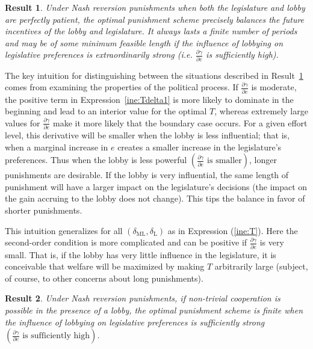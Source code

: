 \documentclass[authoryear, review]{elsarticle}
\newtheorem{result}{Result}
\newcommand{\ga}{\gamma}
\newcommand{\de}{\delta}
\begin{document}
\begin{result}
  Under Nash reversion punishments when both the legislature and lobby are perfectly patient, the optimal punishment scheme precisely balances the future incentives of the lobby and legislature. It always lasts a finite number of periods and may be of some minimum feasible length if the influence of lobbying on legislative preferences is extraordinarily strong (i.e. $\frac{\partial \ga}{\partial e}$ is sufficiently high).
  \label{res:opt1}
\end{result}

The key intuition for distinguishing between the situations described in Result~\ref{res:opt1} comes from examining the properties of the political process. If $\frac{\partial \ga}{\partial e}$ is moderate, the positive term in Expression~\ref{ine:Tdelta1} is more likely to dominate in the beginning and lead to an interior value for the optimal $T$, whereas extremely large values for $\frac{\partial \ga}{\partial e}$ make it more likely that the boundary case occurs. For a given effort level, this derivative will be smaller when the lobby is less influential; that is, when a marginal increase in $e$ creates a smaller increase in the legislature's preferences. Thus when the lobby is less powerful $\left(\frac{\partial \ga}{\partial e}\text{ is smaller}\right)$, longer punishments are desirable. If the lobby is very influential, the same length of punishment will have a larger impact on the legislature's decisions (the impact on the gain accruing to the lobby does not change). This tips the balance in favor of shorter punishments.

This intuition generalizes for all $\left(\de_\text{ML},\de_\text{L}\right)$ as in Expression (\ref{ine:T}). Here the second-order condition is more complicated and can be positive if $\frac{\partial \ga}{\partial e}$ is very small. That is, if the lobby has very little influence in the legislature, it is conceivable that welfare will be maximized by making $T$ arbitrarily large (subject, of course, to other concerns about long punishments).

\begin{result}
  Under Nash reversion punishments, if non-trivial cooperation is possible in the presence of a lobby, the optimal punishment scheme is finite when the influence of lobbying on legislative preferences is sufficiently strong $\left(\frac{\partial \ga}{\partial e}\text{ is sufficiently high}\right)$.
\end{result}
\end{document}
